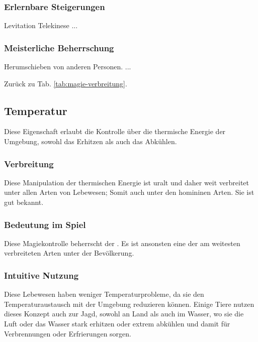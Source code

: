 \subsubsection{Erlernbare Steigerungen}
\begin{outline}
	\1 Levitation
	\1 Telekinese
	\1 ...
\end{outline}

\subsubsection{Meisterliche Beherrschung} 
\begin{outline}
	\1 Herumschieben von anderen Personen.
	\1 ...
\end{outline}
Zurück zu Tab. \ref{tab:magie-verbreitung}.



\subsection{Temperatur}\label{magie:temperatur}
Diese Eigenschaft erlaubt die Kontrolle über die thermische Energie der Umgebung, sowohl das Erhitzen als auch das Abkühlen.

\subsubsection{Verbreitung}
Diese Manipulation der thermischen Energie ist uralt und daher weit verbreitet unter allen Arten von Lebewesen; Somit auch unter den homininen Arten. 
Sie ist gut bekannt.

\subsubsection{Bedeutung im Spiel}
Diese Magiekontrolle beherrscht der . Es ist ansonsten eine der am weitesten verbreiteten Arten unter der Bevölkerung.

\subsubsection{Intuitive Nutzung}
Diese Lebewesen haben weniger Temperaturprobleme, da sie den Temperaturaustausch mit der Umgebung reduzieren können.
Einige Tiere nutzen dieses Konzept auch zur Jagd, sowohl an Land als auch im Wasser, wo sie die Luft oder das Wasser stark erhitzen oder extrem abkühlen und damit für Verbrennungen oder Erfrierungen sorgen.

